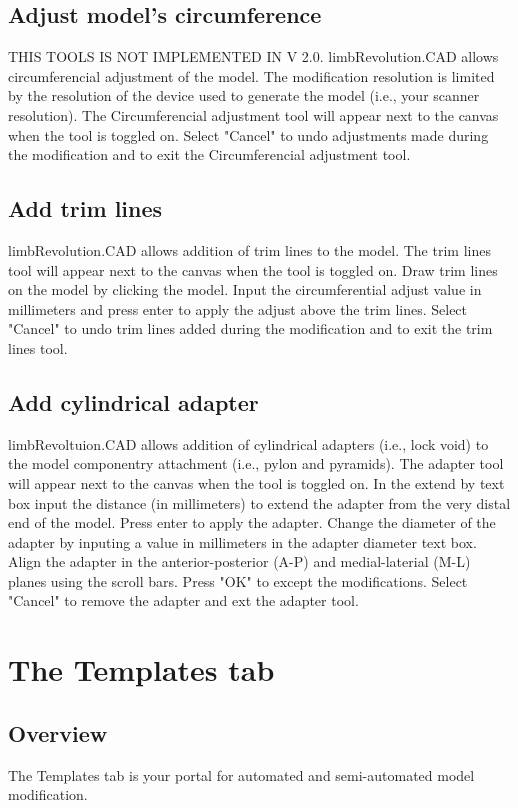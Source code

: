 \documentclass[twoside,a4paper]{refrep}
\begin{document}
	\subsection{Adjust model's circumference}
	\label{AdjCirc}
	THIS TOOLS IS NOT IMPLEMENTED IN V 2.0. limbRevolution.CAD allows circumferencial adjustment of the model. The modification resolution is limited by the resolution of the device used to generate the model (i.e., your scanner resolution). The Circumferencial adjustment tool will appear next to the canvas when the tool is toggled on. Select "Cancel" to undo adjustments made during the modification and to exit the Circumferencial adjustment tool.
	\subsection{Add trim lines}
	\label{TrimLines}
	limbRevolution.CAD allows addition of trim lines to the model. The trim lines tool will appear next to the canvas when the tool is toggled on. Draw trim lines on the model by clicking the model. Input the circumferential adjust value in millimeters and press enter to apply the adjust above the trim lines. Select "Cancel" to undo trim lines added during the modification and to exit the trim lines tool. 
	\subsection{Add cylindrical adapter}
	\label{Adapt}
	limbRevoltuion.CAD allows addition of cylindrical adapters (i.e., lock void) to the model componentry attachment (i.e., pylon and pyramids). The adapter tool will appear next to the canvas when the tool is toggled on. In the extend by text box input the distance (in millimeters) to extend the adapter from the very distal end of the model. Press enter to apply the adapter. Change the diameter of the adapter by inputing a value in millimeters in the adapter diameter text box. Align the adapter in the anterior-posterior (A-P) and medial-laterial (M-L) planes using the scroll bars. Press "OK" to except the modifications. Select "Cancel" to remove the adapter and ext the adapter tool.  
	\section{The Templates tab}
	\subsection{Overview}
	The Templates tab is your portal for automated and semi-automated model modification. 
\end{document}
